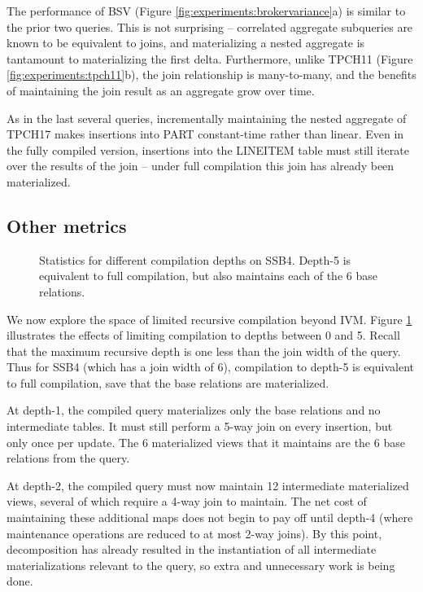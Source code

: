 The performance of BSV (Figure \ref{fig:experiments:brokervariance}a) is similar to the prior two queries.  This is not surprising -- correlated aggregate subqueries are known to be equivalent to joins, and materializing a nested aggregate is tantamount to materializing the first delta.  Furthermore, unlike TPCH11 (Figure \ref{fig:experiments:tpch11}b), the join relationship is many-to-many, and the benefits of maintaining the join result as an aggregate grow over time.

As in the last several queries, incrementally maintaining the nested aggregate of TPCH17 makes insertions into PART constant-time rather than linear.  Even in the fully compiled version, insertions into the LINEITEM table must still iterate over the results of the join -- under full compilation this join has already been materialized.

\subsection{Other metrics}
\label{sec:experiments:othermetrics}

\begin{figure}
\begin{center}
\resizebox{3.4in}{!}{

}
\caption{Statistics for different compilation depths on SSB4.  Depth-5 is equivalent to full compilation, but also maintains each of the 6 base relations.}
\label{fig:experiments:ssb4depth}
\end{center}
\vspace*{-0.2in}
\end{figure}
We now explore the space of limited recursive compilation beyond IVM.  Figure \ref{fig:experiments:ssb4depth} illustrates the effects of limiting compilation to depths between 0 and 5.  Recall that the maximum recursive depth is one less than the join width of the query.  Thus for SSB4 (which has a join width of 6), compilation to depth-5 is equivalent to full compilation, save that the base relations are materialized.

At depth-1, the compiled query materializes only the base relations and no intermediate tables.  It must still perform a 5-way join on every insertion, but  only once per update.  The 6 materialized views that it maintains are the 6 base relations from the query.  

At depth-2, the compiled query must now maintain 12 intermediate materialized views, several of which require a 4-way join to maintain.  The net cost of maintaining these additional maps does not begin to pay off until depth-4 (where maintenance operations are reduced to at most 2-way joins).  By this point, decomposition has already resulted in the instantiation of all intermediate materializations relevant to the query, so extra and unnecessary work is being done.  

